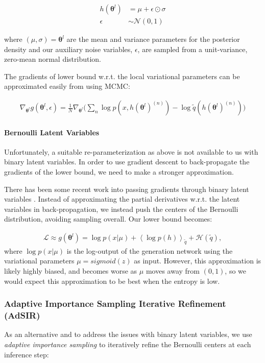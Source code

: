 \documentclass{article} %
\newcommand{\qexp}[1]{\left<#1\right>}
\newcommand{\vects}[1]{\boldsymbol{#1}}
\newcommand{\TT}[0]{\vects{\theta}}
\newcommand{\grad}[0]{\nabla}
\newcommand{\LL}[0]{\mathcal{L}}
\newcommand{\HH}[0]{\mathcal{H}}
\newcommand{\NN}[0]{\mathcal{N}}
\begin{document}
\begin{align}
h(\TT^l) &= \mu + \epsilon \odot \sigma \nonumber \\
\epsilon &\sim \NN(0, 1)
\end{align}

where $(\mu, \sigma) = \TT^l$ are the mean and variance parameters for the posterior density and our auxiliary noise variables, $\epsilon$, are sampled from a unit-variance, zero-mean normal distribution.

The gradients of lower bound w.r.t. the local variational parameters can be approximated easily from using MCMC:

\begin{align}
\grad_{\TT^l} g(\TT^l, \epsilon) = \frac{1}{N} \grad_{\TT^l} \bigg(\sum_n \log p(x, h(\TT^l)^{(n)}) - \log \tilde{q}(h(\TT^l)^{(n)})\bigg)
\end{align}

\paragraph{Bernoulli Latent Variables}
Unfortunately, a suitable re-parameterization as above is not available to us with binary latent variables. In order to use gradient descent to back-propagate the gradients of the lower bound, we need to make a stronger approximation. 

There has been some recent work into passing gradients through binary latent variables \citep{bengio2013estimating}. Instead of approximating the partial derivatives w.r.t. the latent variables in back-propagation, we instead push the centers of the Bernoulli distribution, avoiding sampling overall. Our lower bound becomes:

\begin{align}
	 \LL \approx g(\TT^l) = \log p(x | \mu) + \qexp{\log p(h)}_{\tilde{q}} + \HH(\tilde{q}),
\end{align}
where $\log p(x | \mu)$ is the log-output of the generation network using the variational parameters $\mu = sigmoid(z)$ as input. However, this approximation is likely highly biased, and becomes worse as $\mu$ moves away from $(0, 1)$, so we would expect this approximation to be best when the entropy is low.

\subsubsection{Adaptive Importance Sampling Iterative Refinement (AdSIR)}
As an alternative and to address the issues with binary latent variables, we use \emph{adaptive importance sampling} \citep{karamchandani1989adaptive} to iteratively refine the Bernoulli centers at each inference step:
\end{document}
